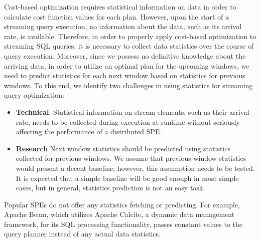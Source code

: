 Cost-based optimization requires statistical information on data in order to calculate cost function values for each plan. However, upon the start of a streaming query execution, no information about the data, such as its arrival rate, is available. Therefore, in order to properly apply cost-based optimization to streaming SQL queries, it is necessary to collect data statistics over the course of query execution. Moreover, since we possess no definitive knowledge about the arriving data, in order to utilize an optimal plan for the upcoming windows, we need to predict statistics for each next window based on statistics for previous windows. To this end, we identify two challenges in using statistics for streaming query optimization:

\begin{itemize}
    \item \textbf{Technical}:
    Statistical information on stream elements, such as their arrival rate, needs to be collected during execution at runtime without seriously affecting the performance of a distributed SPE. %
    \item \textbf{Research}
    Next window statistics should be predicted using statistics collected for previous windows. We assume that previous window statistics would present a decent baseline; however, this assumption needs to be tested. It is expected that a simple baseline will be good enough in most simple cases, but in general, statistics prediction is not an easy task.
\end{itemize}

Popular SPEs do not offer any statistics fetching or predicting. For example, Apache Beam, which utilizes Apache Calcite, a dynamic data management framework, for its SQL processing functionality, passes constant values to the query planner instead of any actual data statistics.

